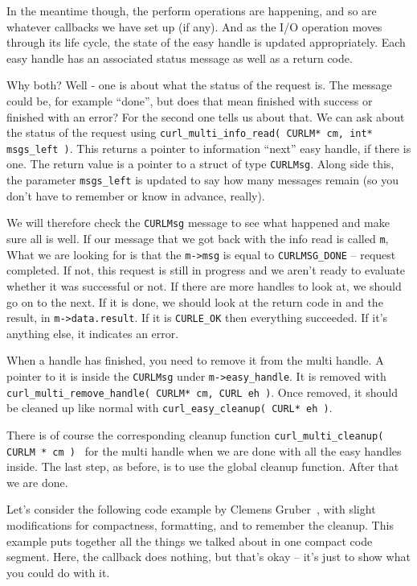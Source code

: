\documentclass[a4paper]{report}
\begin{document}
In the meantime though, the perform operations are happening, and so are whatever callbacks we have set up (if any). And as the I/O operation moves through its life cycle, the state of the easy handle is updated appropriately. Each easy handle has an associated status message as well as a return code.

Why both? Well - one is about what the status of the request is. The message could be, for example ``done'', but does that mean finished with success or finished with an error? For the second one tells us about that. We can ask about the status of the request using \texttt{curl\_multi\_info\_read( CURLM* cm, int* msgs\_left )}. This returns a pointer to information ``next'' easy handle, if there is one. The return value is a pointer to a struct of type \texttt{CURLMsg}. Along side this, the parameter \texttt{msgs\_left} is updated to say how many messages remain (so you don't have to remember or know in advance, really). 

We will therefore check the \texttt{CURLMsg} message to see what happened and make sure all is well. If our message that we got back with the info read is called \texttt{m}, What we are looking for is that the \texttt{m->msg} is equal to \texttt{CURLMSG\_DONE} -- request completed. If not, this request is still in progress and we aren't ready to evaluate whether it was successful or not. If there are more handles to look at, we should go on to the next. If it is done, we should look at the return code in and the result, in \texttt{m->data.result}. If it is \texttt{CURLE\_OK} then everything succeeded. If it's anything else, it indicates an error.

When a handle has finished, you need to remove it from the multi handle. A pointer to it is inside the \texttt{CURLMsg} under \texttt{m->easy\_handle}. It is removed with \texttt{curl\_multi\_remove\_handle( CURLM* cm, CURL eh )}. Once removed, it should be cleaned up like normal with \texttt{curl\_easy\_cleanup( CURL* eh )}.

There is of course the corresponding cleanup function \texttt{curl\_multi\_cleanup( CURLM * cm ) } for the multi handle when we are done with all the easy handles inside. The last step, as before, is to use the global cleanup function. After that we are done. 

Let's consider the following code example by Clemens Gruber~\cite{curlmulti}, with slight modifications for compactness, formatting, and to remember the cleanup. This example puts together all the things we talked about in one compact code segment. Here, the callback does nothing, but that's okay -- it's just to show what you could do with it.
\end{document}
